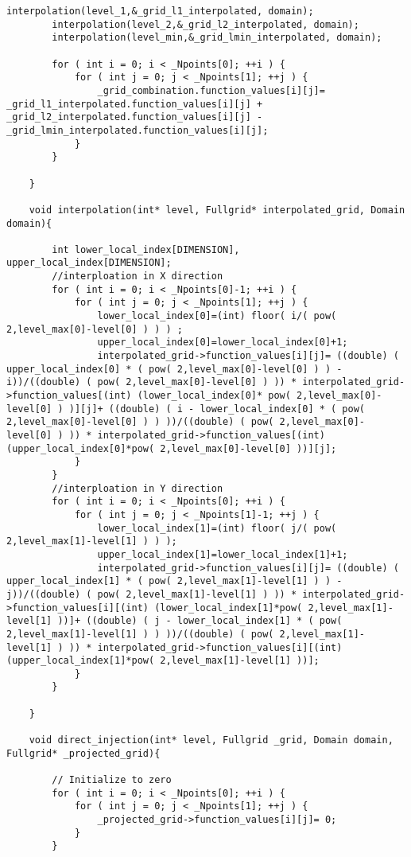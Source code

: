 \begin{lstlisting}[caption= Source code for adaptive combination technique, label=code:combi]
		interpolation(level_1,&_grid_l1_interpolated, domain);
		interpolation(level_2,&_grid_l2_interpolated, domain);
		interpolation(level_min,&_grid_lmin_interpolated, domain);

		for ( int i = 0; i < _Npoints[0]; ++i ) {
			for ( int j = 0; j < _Npoints[1]; ++j ) {
				_grid_combination.function_values[i][j]= _grid_l1_interpolated.function_values[i][j] + _grid_l2_interpolated.function_values[i][j] - _grid_lmin_interpolated.function_values[i][j];
			}
		}

	}

	void interpolation(int* level, Fullgrid* interpolated_grid, Domain domain){

		int lower_local_index[DIMENSION], upper_local_index[DIMENSION];
		//interploation in X direction
		for ( int i = 0; i < _Npoints[0]-1; ++i ) {
			for ( int j = 0; j < _Npoints[1]; ++j ) {
				lower_local_index[0]=(int) floor( i/( pow( 2,level_max[0]-level[0] ) ) ) ;
				upper_local_index[0]=lower_local_index[0]+1;
				interpolated_grid->function_values[i][j]= ((double) ( upper_local_index[0] * ( pow( 2,level_max[0]-level[0] ) ) - i))/((double) ( pow( 2,level_max[0]-level[0] ) )) * interpolated_grid->function_values[(int) (lower_local_index[0]* pow( 2,level_max[0]-level[0] ) )][j]+ ((double) ( i - lower_local_index[0] * ( pow( 2,level_max[0]-level[0] ) ) ))/((double) ( pow( 2,level_max[0]-level[0] ) )) * interpolated_grid->function_values[(int) (upper_local_index[0]*pow( 2,level_max[0]-level[0] ))][j];
			}
		}
		//interploation in Y direction
		for ( int i = 0; i < _Npoints[0]; ++i ) {
			for ( int j = 0; j < _Npoints[1]-1; ++j ) {
				lower_local_index[1]=(int) floor( j/( pow( 2,level_max[1]-level[1] ) ) );
				upper_local_index[1]=lower_local_index[1]+1;
				interpolated_grid->function_values[i][j]= ((double) ( upper_local_index[1] * ( pow( 2,level_max[1]-level[1] ) ) - j))/((double) ( pow( 2,level_max[1]-level[1] ) )) * interpolated_grid->function_values[i][(int) (lower_local_index[1]*pow( 2,level_max[1]-level[1] ))]+ ((double) ( j - lower_local_index[1] * ( pow( 2,level_max[1]-level[1] ) ) ))/((double) ( pow( 2,level_max[1]-level[1] ) )) * interpolated_grid->function_values[i][(int) (upper_local_index[1]*pow( 2,level_max[1]-level[1] ))];
			}
		}

	}

	void direct_injection(int* level, Fullgrid _grid, Domain domain, Fullgrid* _projected_grid){

		// Initialize to zero
		for ( int i = 0; i < _Npoints[0]; ++i ) {
			for ( int j = 0; j < _Npoints[1]; ++j ) {
				_projected_grid->function_values[i][j]= 0;
			}
		}


\end{lstlisting}
